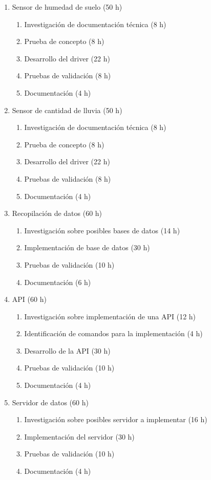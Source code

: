 \documentclass[
11pt, %
codirector, %
]{charter}
\begin{document}
\begin{enumerate}
\item Sensor de humedad de suelo (50 h)
	\begin{enumerate}
	\item Investigación de documentación técnica (8 h)
	\item Prueba de concepto (8 h)
	\item Desarrollo del driver (22 h)
	\item Pruebas de validación (8 h)
	\item Documentación (4 h)
	\end{enumerate}
	
\item Sensor de cantidad de lluvia (50 h)
	\begin{enumerate}
	\item Investigación de documentación técnica (8 h)
	\item Prueba de concepto (8 h)
	\item Desarrollo del driver (22 h)
	\item Pruebas de validación (8 h)
	\item Documentación (4 h)
	\end{enumerate}
	
\item Recopilación de datos (60 h)
	\begin{enumerate}
	\item Investigación sobre posibles bases de datos (14 h)
	\item Implementación de base de datos (30 h)
	\item Pruebas de validación (10 h)
	\item Documentación (6 h)
	\end{enumerate}

\item API (60 h)
	\begin{enumerate}
	\item Investigación sobre implementación de una API (12 h)
	\item Identificación de comandos para la implementación (4 h)
	\item Desarrollo de la API (30 h)
	\item Pruebas de validación (10 h)
	\item Documentación (4 h)
	\end{enumerate}

\item Servidor de datos (60 h)
	\begin{enumerate}
	\item Investigación sobre posibles servidor a implementar (16 h)	
	\item Implementación del servidor (30 h)
	\item Pruebas de validación (10 h)
	\item Documentación (4 h)
	\end{enumerate}
	

\end{enumerate}
\end{document}
